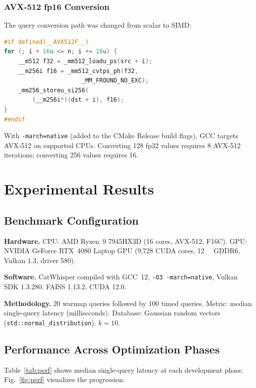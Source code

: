\documentclass[conference]{IEEEtran}
\begin{document}
\subsubsection{AVX-512 fp16 Conversion}

The query conversion path was changed from scalar to SIMD:

\begin{lstlisting}[language=C++,caption={AVX-512 fp16 conversion}]
#if defined(__AVX512F__)
for (; i + 16u <= n; i += 16u) {
    __m512 f32 = _mm512_loadu_ps(src + i);
    __m256i f16 = _mm512_cvtps_ph(f32,
                      _MM_FROUND_NO_EXC);
    _mm256_storeu_si256(
        (__m256i*)(dst + i), f16);
}
#endif
\end{lstlisting}

With \texttt{-march=native} (added to the CMake Release build flags),
GCC targets AVX-512 on supported CPUs.  Converting 128 fp32 values
requires 8 AVX-512 iterations; converting 256 values requires 16.

\section{Experimental Results}
\label{sec:results}

\subsection{Benchmark Configuration}

\textbf{Hardware.}
CPU: AMD Ryzen~9 7945HX3D (16 cores, AVX-512, F16C).
GPU: NVIDIA GeForce RTX~4080 Laptop GPU (9{,}728 CUDA cores,
\SI{12}{\giga\byte} GDDR6, Vulkan 1.3, driver 580).

\textbf{Software.}
CatWhisper compiled with GCC~12, \texttt{-O3 -march=native}, Vulkan SDK
1.3.280.
FAISS 1.13.2, CUDA 12.0.

\textbf{Methodology.}
20 warmup queries followed by 100 timed queries.
Metric: median single-query latency (milliseconds).
Database: Gaussian random vectors (\texttt{std::normal\_distribution}).
$k=10$.

\subsection{Performance Across Optimization Phases}

Table~\ref{tab:perf} shows median single-query latency at each
development phase.  Fig.~\ref{fig:perf} visualizes the progression.
\end{document}
